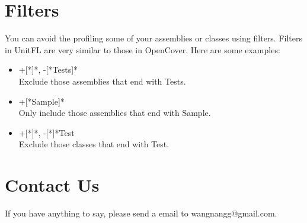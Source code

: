 \documentclass[11pt]{article} %
\begin{document}
\section{Filters}
You can avoid the profiling some of your assemblies or classes using filters. Filters in UnitFL are very similar to those in OpenCover.
Here are some examples: 
\begin{itemize}
\item{+[*]*, -[*Tests]*} \\
Exclude those assemblies that end with Tests.

\item{+[*Sample]*} \\
Only include those assemblies that end with Sample.

\item{+[*]*, -[*]*Test} \\
Exclude those classes that end with Test.

\end{itemize}

\section{Contact Us}
If you have anything to say, please send a email to wangnangg@gmail.com.
\end{document}
